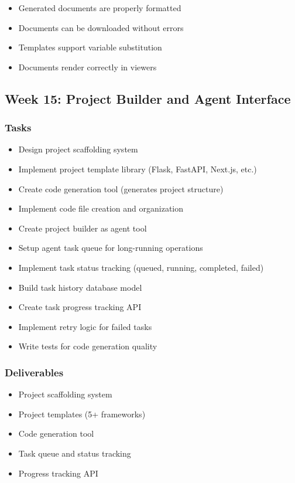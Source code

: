 \documentclass[12pt,oneside]{report}
\begin{document}
\begin{itemize}
    \item Generated documents are properly formatted
    \item Documents can be downloaded without errors
    \item Templates support variable substitution
    \item Documents render correctly in viewers
\end{itemize}

\subsection{Week 15: Project Builder and Agent Interface}

\subsubsection{Tasks}

\begin{itemize}
    \item Design project scaffolding system
    \item Implement project template library (Flask, FastAPI, Next.js, etc.)
    \item Create code generation tool (generates project structure)
    \item Implement code file creation and organization
    \item Create project builder as agent tool
    \item Setup agent task queue for long-running operations
    \item Implement task status tracking (queued, running, completed, failed)
    \item Build task history database model
    \item Create task progress tracking API
    \item Implement retry logic for failed tasks
    \item Write tests for code generation quality
\end{itemize}

\subsubsection{Deliverables}

\begin{itemize}
    \item Project scaffolding system
    \item Project templates (5+ frameworks)
    \item Code generation tool
    \item Task queue and status tracking
    \item Progress tracking API
\end{itemize}
\end{document}
